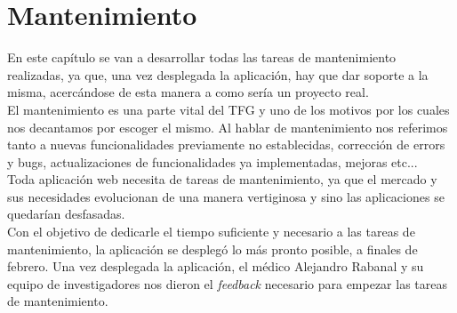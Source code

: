 \chapter{Mantenimiento}

En este capítulo se van a desarrollar todas las tareas de mantenimiento realizadas, ya que, una vez desplegada la aplicación, hay que dar soporte a la misma, acercándose de esta manera a como sería un proyecto real. \\

El mantenimiento es una parte vital del TFG y uno de los motivos por los cuales nos decantamos por escoger el mismo. Al hablar de mantenimiento nos referimos tanto a nuevas funcionalidades previamente no establecidas, corrección de errors y bugs, actualizaciones de funcionalidades ya implementadas, mejoras etc... \\

Toda aplicación web necesita de tareas de mantenimiento, ya que el mercado y sus necesidades evolucionan de una manera vertiginosa y sino las aplicaciones se quedarían desfasadas. \\

Con el objetivo de dedicarle el tiempo suficiente y necesario a las tareas de mantenimiento, la aplicación se desplegó lo más pronto posible, a finales de febrero.
Una vez desplegada la aplicación, el médico Alejandro Rabanal y su equipo de investigadores nos dieron el \textit{feedback} necesario para empezar las tareas de mantenimiento. \\

